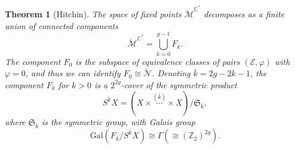 \documentclass[12pt,a4paper]{amsbook}
\newtheorem{thm}{Theorem}[chapter]
\theoremstyle{remark} \newtheorem{rmk}[thm]{Remark}
\theoremstyle{definition} \newtheorem{defn}[thm]{Definition}
\theoremstyle{definition} \newtheorem{ex}[thm]{Example}
\theoremstyle{definition} \newtheorem{ej}{Exercise}
\newcommand{\C}{\mathbb C}
\newcommand{\Z}{\mathbb Z}
\newcommand{\cM}{\mathcal M}
\newcommand{\cN}{\mathcal N}
\newcommand{\sE}{\mathscr E}
\begin{document}
\begin{thm}[Hitchin]
The space of fixed points $\check{\cM}^{\C^*}$ decomposes as a finite union of connected components
\begin{equation*}
\check{\cM}^{\C^*} = \bigcup_{k=0}^{g-1} F_k.
\end{equation*}
The component $F_0$ is the subspace of equivalence classes of pairs $(\sE,\varphi)$ with $\varphi=0$, and thus we can identify $F_0 \cong \check{\cN}$. Denoting $\bar{k}=2g-2k-1$, the component $F_k$ for $k>0$ is a $2^{2g}$-cover of the symmetric product
\begin{equation*}
S^{\bar{k}} X = (X\times \overset{(\bar{k})}{\cdots} \times X)/\mathfrak{S}_{\bar{k}},
\end{equation*}
where $\mathfrak{S}_{\bar{k}}$ is the symmetric group, with Galois group \[\mathrm{Gal}(F_k/S^{\bar{k}}X)\cong \Gamma (\cong (\Z_2)^{2g}).\]
\end{thm}
\end{document}
